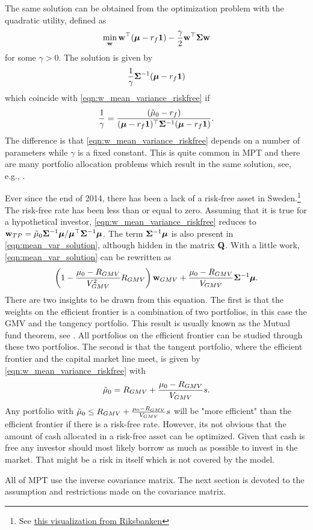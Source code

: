 \documentclass[12pt, oneside]{book}\usepackage{knitr}
\begin{document}
{The same solution can be obtained from the optimization problem with the quadratic utility, defined as 
$$\min_{\mathbf{w}} \mathbf{w}^\top (\mbox{\boldmath$\mu$}- r_f\mathbf{1}) - \frac{\gamma}{2} \mathbf{w}^\top \mathbf{\Sigma} \mathbf{w}$$ 
for some $\gamma > 0$.
The solution is given by 
$$\frac{1}{\gamma}\mathbf{\Sigma}^{-1} (\mbox{\boldmath$\mu$}-r_f \mathbf{1})$$
which coincide with \eqref{eqn:w_mean_variance_riskfree} if 
$$\frac{1}{\gamma} = \frac{(\tilde\mu_0-r_f)}{(\mbox{\boldmath$\mu$}-r_f \mathbf{1})^\top \mathbf{\Sigma}^{-1} (\mbox{\boldmath$\mu$}-r_f \mathbf{1})}.$$ 
The difference is that \eqref{eqn:w_mean_variance_riskfree} depends on a number of parameters while $\gamma$ is a fixed constant.
This is quite common in MPT and there are many portfolio allocation problems which result in the same solution, see, e.g., \citet{bodnar2013equivalence}.

Ever since the end of 2014, there has been a lack of a risk-free asset in Sweden.\footnote{See \href{https://www.riksbank.se/sv/statistik/sok-rantor--valutakurser/reporanta-in--och-utlaningsranta/}{this visualization from Riksbanken}} 
The risk-free rate has been less than or equal to zero. 
Assuming that it is true for a hypothetical investor, \eqref{eqn:w_mean_variance_riskfree} reduces to $\mathbf{w}_{TP} = \tilde\mu_0 \mathbf{\Sigma}^{-1} \mbox{\boldmath$\mu$} / \mbox{\boldmath$\mu$}^\top \mathbf{\Sigma}^{-1} \mbox{\boldmath$\mu$}$. 
The term $\mathbf{\Sigma}^{-1} \mbox{\boldmath$\mu$}$ is also present in \eqref{eqn:mean_var_solution}, although hidden in the matrix $\mathbf{Q}$. 
With a little work, \eqref{eqn:mean_var_solution} can be rewritten as
$$
\left(1 - \frac{\mu_0-R_{GMV}}{V_{GMV}^2} R_{GMV} \right) \mathbf{w}_{GMV} + \frac{\mu_0-R_{GMV}}{V_{GMV}} \mathbf{\Sigma}^{-1} \mbox{\boldmath$\mu$}.
$$
There are two insights to be drawn from this equation. 
The first is that the weights on the efficient frontier is a combination of two portfolios, in this case the GMV and the tangency portfolio. 
This result is usually known as the Mutual fund theorem, see \citet{tobin1958liquidity}.
All portfolios on the efficient frontier can be studied through these two portfolios. 
The second is that the tangent portfolio, where the efficient frontier and the capital market line meet, is given by \eqref{eqn:w_mean_variance_riskfree} with 
$$
\tilde\mu_0 = R_{GMV} + \frac{\mu_0-R_{GMV}}{V_{GMV}} s.
$$
Any portfolio with $\tilde\mu_0\leq R_{GMV} + \frac{\mu_0-R_{GMV}}{V_{GMV}} s$ will be "more efficient" than the efficient frontier if there is a risk-free rate. 
However, its not obvious that the amount of cash allocated in a risk-free asset can be optimized. 
Given that cash is free any investor should most likely borrow as much as possible to invest in the market.
That might be a risk in itself which is not covered by the model.

All of MPT use the inverse covariance matrix. 
The next section is devoted to the assumption and restrictions made on the covariance matrix.  

}
\end{document}
